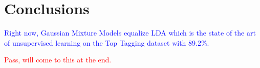 \section{Conclusions}
\label{sec:conclusion}

\textcolor{blue}{Right now, Gaussian Mixture Models equalize LDA which is the state of the art of unsupervised learning on the Top Tagging dataset with 89.2\%.}


\textcolor{red}{Pass, will come to this at the end.}